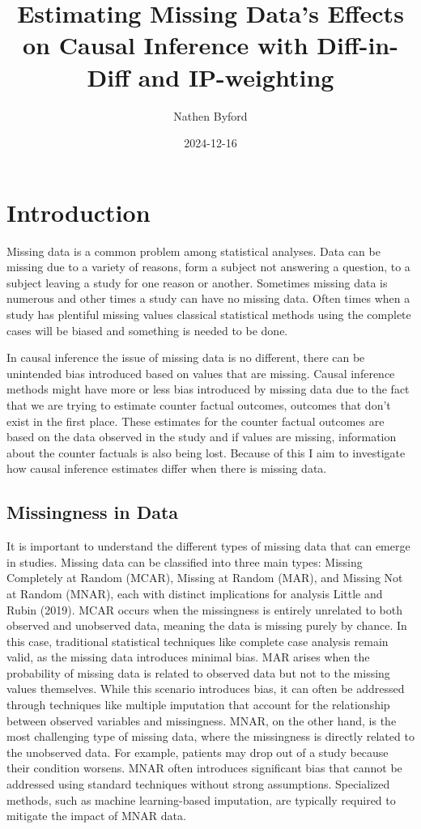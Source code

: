 \documentclass[
]{article}
\title{Estimating Missing Data's Effects on Causal Inference with
Diff-in-Diff and IP-weighting}
\author{Nathen Byford}
\date{2024-12-16}
\begin{document}
\maketitle

\section{Introduction}\label{introduction}

Missing data is a common problem among statistical analyses. Data can be
missing due to a variety of reasons, form a subject not answering a
question, to a subject leaving a study for one reason or another.
Sometimes missing data is numerous and other times a study can have no
missing data. Often times when a study has plentiful missing values
classical statistical methods using the complete cases will be biased
and something is needed to be done.

In causal inference the issue of missing data is no different, there can
be unintended bias introduced based on values that are missing. Causal
inference methods might have more or less bias introduced by missing
data due to the fact that we are trying to estimate counter factual
outcomes, outcomes that don't exist in the first place. These estimates
for the counter factual outcomes are based on the data observed in the
study and if values are missing, information about the counter factuals
is also being lost. Because of this I aim to investigate how causal
inference estimates differ when there is missing data.

\subsection{Missingness in Data}\label{missingness-in-data}

It is important to understand the different types of missing data that
can emerge in studies. Missing data can be classified into three main
types: Missing Completely at Random (MCAR), Missing at Random (MAR), and
Missing Not at Random (MNAR), each with distinct implications for
analysis Little and Rubin (2019). MCAR occurs when the missingness is
entirely unrelated to both observed and unobserved data, meaning the
data is missing purely by chance. In this case, traditional statistical
techniques like complete case analysis remain valid, as the missing data
introduces minimal bias. MAR arises when the probability of missing data
is related to observed data but not to the missing values themselves.
While this scenario introduces bias, it can often be addressed through
techniques like multiple imputation that account for the relationship
between observed variables and missingness. MNAR, on the other hand, is
the most challenging type of missing data, where the missingness is
directly related to the unobserved data. For example, patients may drop
out of a study because their condition worsens. MNAR often introduces
significant bias that cannot be addressed using standard techniques
without strong assumptions. Specialized methods, such as machine
learning-based imputation, are typically required to mitigate the impact
of MNAR data.
\end{document}
